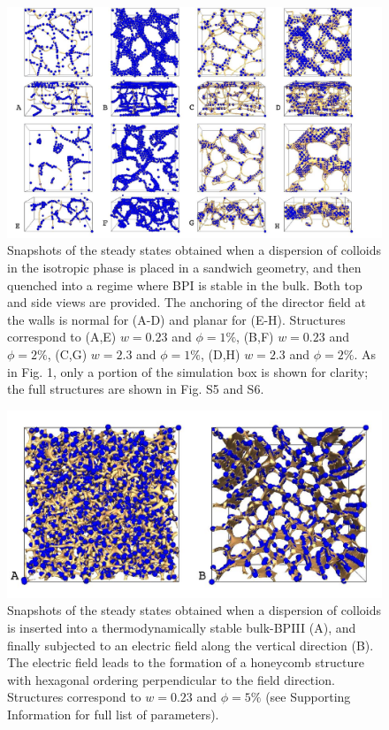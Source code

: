 \documentclass[12pt]{article}
\begin{document}
\begin{figure}
\centerline{\includegraphics[width=\textwidth]{text-fig2.jpg}}
\caption{Snapshots of the steady states obtained when a dispersion of colloids in the isotropic phase is placed in a sandwich geometry, 
and then quenched into a regime where BPI is stable in the bulk. Both top and side views are provided.
The anchoring of the director field at the walls is normal for (A-D) and planar for (E-H). 
Structures correspond to (A,E) $w=0.23$ and $\phi=1\%$, 
(B,F) $w=0.23$ and $\phi=2\%$, 
(C,G) $w=2.3$ and $\phi=1\%$,
(D,H) $w=2.3$ and $\phi=2\%$.
As in Fig. 1, only a portion of the simulation box is shown for clarity;
the full structures are shown in Fig. S5 and S6.}
\end{figure}


\begin{figure}
\centerline{\includegraphics[width=\textwidth]{text-fig3.jpg}}
\caption{Snapshots of the steady states obtained when a dispersion of colloids is inserted into a thermodynamically stable bulk-BPIII (A), and finally subjected to an electric field along the vertical direction (B). The electric field leads to the formation of a honeycomb structure with hexagonal ordering perpendicular to the field direction. 
Structures correspond to $w=0.23$ and $\phi=5\%$ (see Supporting Information
for full list of parameters). }
\end{figure}
\end{document}
